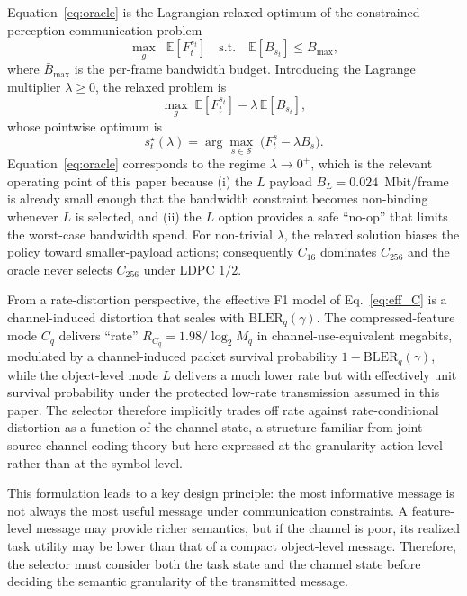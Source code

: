 \documentclass[journal]{IEEEtran}
\begin{document}
Equation~\eqref{eq:oracle} is the Lagrangian-relaxed optimum of the constrained perception-communication problem
\begin{equation}
\max_g \;\;\mathbb{E}\!\left[F_t^{s_t}\right] \quad \text{s.t.} \quad \mathbb{E}\!\left[B_{s_t}\right] \le \bar B_{\max},
\label{eq:constrained}
\end{equation}
where $\bar B_{\max}$ is the per-frame bandwidth budget. Introducing the Lagrange multiplier $\lambda \ge 0$, the relaxed problem is
\begin{equation}
\max_g \;\mathbb{E}\!\left[F_t^{s_t}\right] - \lambda\,\mathbb{E}\!\left[B_{s_t}\right],
\end{equation}
whose pointwise optimum is
\begin{equation}
s_t^\star(\lambda) = \arg\max_{s \in \mathcal{S}}\; \bigl(F_t^s - \lambda B_s\bigr).
\label{eq:lagrangian_oracle}
\end{equation}
Equation~\eqref{eq:oracle} corresponds to the regime $\lambda \to 0^+$, which is the relevant operating point of this paper because (i) the $L$ payload $B_L = 0.024$~Mbit/frame is already small enough that the bandwidth constraint becomes non-binding whenever $L$ is selected, and (ii) the $L$ option provides a safe ``no-op'' that limits the worst-case bandwidth spend. For non-trivial $\lambda$, the relaxed solution biases the policy toward smaller-payload actions; consequently $C_{16}$ dominates $C_{256}$ and the oracle never selects $C_{256}$ under LDPC $1/2$.

From a rate-distortion perspective, the effective F1 model of Eq.~\eqref{eq:eff_C} is a channel-induced distortion that scales with $\mathrm{BLER}_q(\gamma)$. The compressed-feature mode $C_q$ delivers ``rate'' $R_{C_q} = 1.98 / \log_2 M_q$ in channel-use-equivalent megabits, modulated by a channel-induced packet survival probability $1 - \mathrm{BLER}_q(\gamma)$, while the object-level mode $L$ delivers a much lower rate but with effectively unit survival probability under the protected low-rate transmission assumed in this paper. The selector therefore implicitly trades off rate against rate-conditional distortion as a function of the channel state, a structure familiar from joint source-channel coding theory but here expressed at the granularity-action level rather than at the symbol level.

This formulation leads to a key design principle: the most informative message is not always the most useful message under communication constraints. A feature-level message may provide richer semantics, but if the channel is poor, its realized task utility may be lower than that of a compact object-level message. Therefore, the selector must consider both the task state and the channel state before deciding the semantic granularity of the transmitted message.
\end{document}
